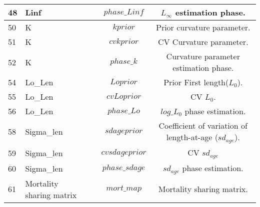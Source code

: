 \documentclass{article}
\begin{document}
\begin{tabular}{|  p{0.9cm} | p{1.9cm}  | p{1.9cm} | c | c |}
48 &  Linf &   & $phase\_Linf$ & $L_{\infty}$ estimation phase.\\ \hline
50 &  K &   & $kprior$ & Prior curvature parameter.\\ \hline
51 & K &   & $cvkprior$ & CV Curvature parameter.\\ \hline
52 &  K &   & $phase\_k$ & Curvature parameter estimation phase.\\ \hline
54 &  Lo\_Len &   & $Loprior$ & Prior First length($L_0$).\\ \hline
55 &  Lo\_Len  &   & $cvLoprior$ & CV $L_0$.\\ \hline
56 &  Lo\_Len  &   & $phase\_Lo$ & $log\_L_0$ phase estimation.\\ \hline
58 &  Sigma\_len  &   &  
 $sdageprior$ & Coefficient of variation of length-at-age ($sd_{age}$).\\ \hline
59 &  Sigma\_len  &   & $cvsdageprior$ & CV $sd_{age}$\\ \hline
60 &  Sigma\_len  &   & $phase\_sdage$  & $sd_{age}$ phase estimation.\\ \hline
61 &  Mortality sharing matrix  &   & $mort\_map$  & Mortality sharing matrix.\\ \hline


\end{tabular} 
\end{document}
